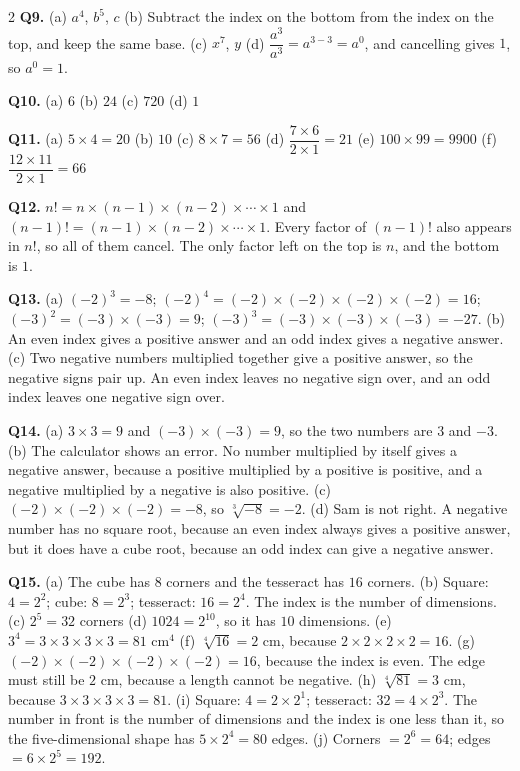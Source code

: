 \documentclass[12pt,a4paper]{article}
\begin{document}
{\begin{multicols}{2}
\textbf{Q9.} (a) $a^4$, \; $b^5$, \; $c$ \quad (b) Subtract the index on the
bottom from the index on the top, and keep the same base. \quad
(c) $x^7$, \; $y$ \quad (d) $\dfrac{a^3}{a^3}=a^{3-3}=a^0$, and cancelling
gives $1$, so $a^0=1$.

\textbf{Q10.} (a) $6$ \quad (b) $24$ \quad (c) $720$ \quad (d) $1$

\textbf{Q11.} (a) $5\times4=20$ \quad (b) $10$ \quad (c) $8\times7=56$ \quad
(d) $\dfrac{7\times6}{2\times1}=21$ \quad (e) $100\times99=9900$ \quad
(f) $\dfrac{12\times11}{2\times1}=66$

\textbf{Q12.} $n!=n\times(n-1)\times(n-2)\times\cdots\times1$ and
$(n-1)!=(n-1)\times(n-2)\times\cdots\times1$. Every factor of $(n-1)!$ also
appears in $n!$, so all of them cancel. The only factor left on the top is $n$,
and the bottom is $1$.

\textbf{Q13.} (a) $(-2)^3=-8$; \;
$(-2)^4=(-2)\times(-2)\times(-2)\times(-2)=16$; \;
$(-3)^2=(-3)\times(-3)=9$; \; $(-3)^3=(-3)\times(-3)\times(-3)=-27$. \quad
(b) An even index gives a positive answer and an odd index gives a negative
answer. \quad (c) Two negative numbers multiplied together give a positive
answer, so the negative signs pair up. An even index leaves no negative sign
over, and an odd index leaves one negative sign over.

\textbf{Q14.} (a) $3\times3=9$ and $(-3)\times(-3)=9$, so the two numbers are
$3$ and $-3$. \quad (b) The calculator shows an error. No number multiplied by
itself gives a negative answer, because a positive multiplied by a positive is
positive, and a negative multiplied by a negative is also positive. \quad
(c) $(-2)\times(-2)\times(-2)=-8$, so $\sqrt[3]{-8}=-2$. \quad (d) Sam is not
right. A negative number has no square root, because an even index always gives
a positive answer, but it does have a cube root, because an odd index can give
a negative answer.

\textbf{Q15.} (a) The cube has $8$ corners and the tesseract has $16$
corners. \quad (b) Square: $4=2^2$; \; cube: $8=2^3$; \; tesseract:
$16=2^4$. The index is the number of dimensions. \quad
(c) $2^5=32$ corners \quad (d) $1024=2^{10}$, so it has $10$ dimensions. \quad
(e) $3^4=3\times3\times3\times3=81$ cm$^4$ \quad
(f) $\sqrt[4]{16}=2$ cm, because $2\times2\times2\times2=16$. \quad
(g) $(-2)\times(-2)\times(-2)\times(-2)=16$, because the index is even. The
edge must still be $2$ cm, because a length cannot be negative. \quad
(h) $\sqrt[4]{81}=3$ cm, because $3\times3\times3\times3=81$. \quad
(i) Square: $4=2\times2^1$; \; tesseract: $32=4\times2^3$. The number in front
is the number of dimensions and the index is one less than it, so the
five-dimensional shape has $5\times2^4=80$ edges. \quad
(j) Corners $=2^6=64$; \; edges $=6\times2^5=192$.

\end{multicols}
}
\end{document}
